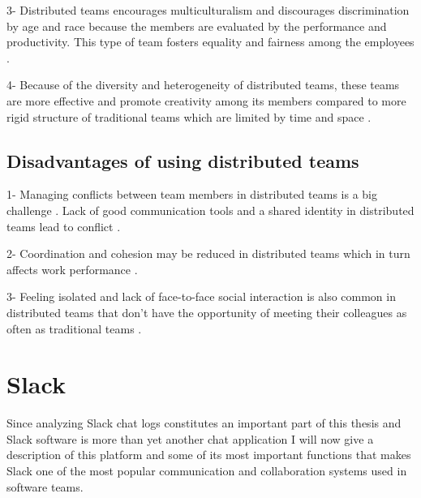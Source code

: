 3- Distributed teams encourages multiculturalism and discourages discrimination by age and race because the members are evaluated by the performance and productivity. This type of team fosters equality and fairness among the employees \citep{Bergiel2007}.

4- Because of the diversity and heterogeneity of distributed teams, these teams are more effective and promote creativity among its members compared to more rigid structure of traditional teams which are limited by time and space \citep{Bergiel2008}.

\section{Disadvantages of using distributed teams}

1- Managing conflicts between team members in distributed teams is a big challenge \citep{Hinds2003}. Lack of good communication tools and a shared identity in distributed teams lead to conflict \citep{Hinds2005a}. 

2- Coordination and cohesion may be reduced in distributed teams which in turn affects work performance \citep{DeRosa2004}.

3- Feeling isolated and lack of face-to-face social interaction is also common in distributed teams that don't have the opportunity of meeting their colleagues as often as traditional teams \citep{Kiesler2002}.

\chapter{Slack} \label{slack}

Since analyzing Slack chat logs constitutes an important part of this thesis and Slack software is more than yet another chat application I will now give a description of this platform and some of its most important functions that makes Slack one of the most popular communication and collaboration systems used in software teams.

